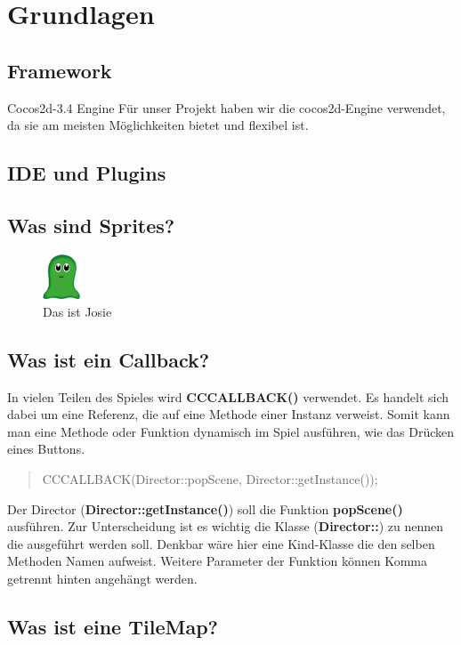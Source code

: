 \chapter{Grundlagen}

\section{Framework}

Cocos2d-3.4 Engine
Für unser Projekt haben wir die cocos2d-Engine verwendet, da sie am meisten Möglichkeiten bietet und flexibel ist.

\section{IDE und Plugins}

\section{Was sind Sprites?}
\begin{figure}[h]
  \includegraphics[width=0.1\textwidth]{resources/josie}
  \caption{Das ist Josie}
  \label{fig:josie} 
\end{figure}


\section{Was ist ein Callback?}

In vielen Teilen des Spieles wird \textbf{CC\textunderscore CALLBACK()} verwendet. Es handelt sich dabei um eine Referenz, die auf eine Methode einer Instanz verweist. Somit kann man eine Methode oder Funktion dynamisch im Spiel ausführen, wie das Drücken eines Buttons.

\begin{quote}
CC\textunderscore CALLBACK(Director::popScene, Director::getInstance());
\end{quote}

Der Director (\textbf{Director::getInstance()}) soll die Funktion \textbf{popScene()} ausführen. Zur Unterscheidung ist es wichtig die Klasse (\textbf{Director::}) zu nennen die ausgeführt werden soll. Denkbar wäre hier eine Kind-Klasse die den selben Methoden Namen aufweist. 
Weitere Parameter der Funktion können Komma getrennt hinten angehängt werden.

\section{Was ist eine TileMap?}